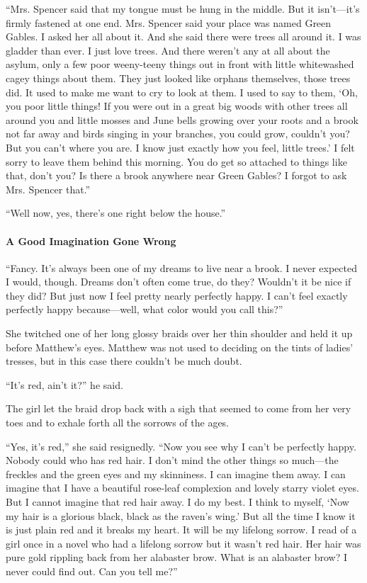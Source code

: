 \documentclass{article}
\begin{document}
``Mrs. Spencer said that my tongue must be hung in the middle. But it isn't---it's firmly fastened at one end. Mrs. Spencer said your place was named Green Gables. I asked her all about it. And she said there were trees all around it. I was gladder than ever. I just love trees. And there weren't any at all about the asylum, only a few poor weeny-teeny things out in front with little whitewashed cagey things about them. They just looked like orphans themselves, those trees did. It used to make me want to cry to look at them. I used to say to them, `Oh, you poor little things! If you were out in a great big woods with other trees all around you and little mosses and June bells growing over your roots and a brook not far away and birds singing in your branches, you could grow, couldn't you? But you can't where you are. I know just exactly how you feel, little trees.' I felt sorry to leave them behind this morning. You do get so attached to things like that, don't you? Is there a brook anywhere near Green Gables? I forgot to ask Mrs. Spencer that.''

``Well now, yes, there's one right below the house.''

\paragraph{A Good Imagination Gone Wrong}
``Fancy. It's always been one of my dreams to live near a brook. I never expected I would, though. Dreams don't often come true, do they? Wouldn't it be nice if they did? But just now I feel pretty nearly perfectly happy. I can't feel exactly perfectly happy because---well, what color would you call this?''

She twitched one of her long glossy braids over her thin shoulder and held it up before Matthew's eyes. Matthew was not used to deciding on the tints of ladies' tresses, but in this case there couldn't be much doubt.

``It's red, ain't it?'' he said.

The girl let the braid drop back with a sigh that seemed to come from her very toes and to exhale forth all the sorrows of the ages.

``Yes, it's red,'' she said resignedly. ``Now you see why I can't be perfectly happy. Nobody could who has red hair. I don't mind the other things so much---the freckles and the green eyes and my skinniness. I can imagine them away. I can imagine that I have a beautiful rose-leaf complexion and lovely starry violet eyes. But I cannot imagine that red hair away. I do my best. I think to myself, `Now my hair is a glorious black, black as the raven's wing.' But all the time I know it is just plain red and it breaks my heart. It will be my lifelong sorrow. I read of a girl once in a novel who had a lifelong sorrow but it wasn't red hair. Her hair was pure gold rippling back from her alabaster brow. What is an alabaster brow? I never could find out. Can you tell me?''
\end{document}
